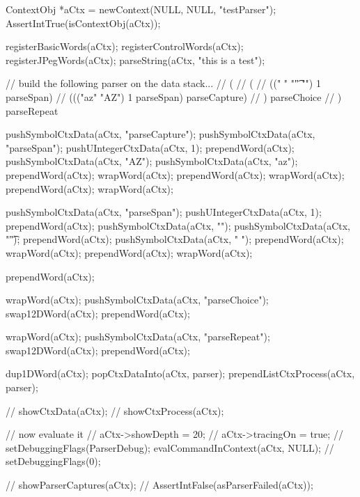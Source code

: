 

\startCTest
  ContextObj *aCtx = newContext(NULL, NULL, "testParser");
  AssertIntTrue(isContextObj(aCtx));
  
  registerBasicWords(aCtx);
  registerControlWords(aCtx);
  registerJPegWords(aCtx);
  parseString(aCtx, "this is a test");

  // build the following parser on the data stack...
  // ( 
  //   (
  //     ((" " "\t" "\n") 1 parseSpan)
  //     ((("az" "AZ") 1 parseSpan) parseCapture)
  //   ) parseChoice
  // ) parseRepeat

  pushSymbolCtxData(aCtx, "parseCapture");
  pushSymbolCtxData(aCtx, "parseSpan");
  pushUIntegerCtxData(aCtx, 1);
  prependWord(aCtx);
  pushSymbolCtxData(aCtx, "AZ");
  pushSymbolCtxData(aCtx, "az");
  prependWord(aCtx);
  wrapWord(aCtx);
  prependWord(aCtx);
  wrapWord(aCtx);
  prependWord(aCtx);
  wrapWord(aCtx);
  
  pushSymbolCtxData(aCtx, "parseSpan");
  pushUIntegerCtxData(aCtx, 1);
  prependWord(aCtx);
  pushSymbolCtxData(aCtx, "\n");
  pushSymbolCtxData(aCtx, "\t");
  prependWord(aCtx);
  pushSymbolCtxData(aCtx, " ");
  prependWord(aCtx);
  wrapWord(aCtx);
  prependWord(aCtx);
  wrapWord(aCtx);
  
  prependWord(aCtx);
  
  wrapWord(aCtx);
  pushSymbolCtxData(aCtx, "parseChoice");
  swap12DWord(aCtx);
  prependWord(aCtx);
  
  wrapWord(aCtx);
  pushSymbolCtxData(aCtx, "parseRepeat");
  swap12DWord(aCtx);
  prependWord(aCtx);
  
  dup1DWord(aCtx);
  popCtxDataInto(aCtx, parser);
  prependListCtxProcess(aCtx, parser);
  
//  showCtxData(aCtx);
//  showCtxProcess(aCtx);
  
  // now evaluate it
//  aCtx->showDepth = 20;
//  aCtx->tracingOn = true;
//  setDebuggingFlags(ParserDebug);
  evalCommandInContext(aCtx, NULL);
//  setDebuggingFlags(0);
  
//  showParserCaptures(aCtx);
//  AssertIntFalse(asParserFailed(aCtx));
\stopCTest
\stopTestCase
\stopTestSuite